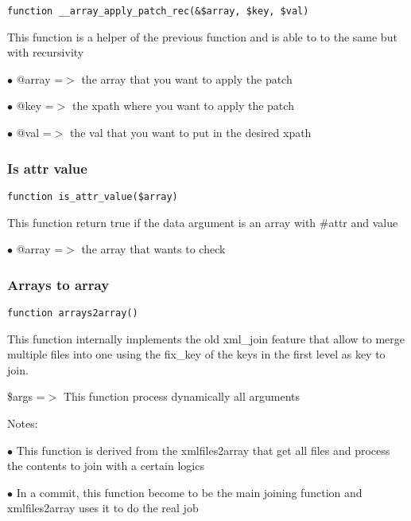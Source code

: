 \documentclass[a4paper]{article}
\begin{document}
\begin{lstlisting}
function __array_apply_patch_rec(&$array, $key, $val)
\end{lstlisting}

This function is a helper of the previous function and is able to to the
same but with recursivity

\begin{compactitem}
\item[\color{myblue}$\bullet$] @array =$>$ the array that you want to apply the patch
\item[\color{myblue}$\bullet$] @key   =$>$ the xpath where you want to apply the patch
\item[\color{myblue}$\bullet$] @val   =$>$ the val that you want to put in the desired xpath
\end{compactitem}

\hypertarget{toc62}{}
\subsubsection{Is attr value}

\begin{lstlisting}
function is_attr_value($array)
\end{lstlisting}

This function return true if the data argument is an array with \#attr and value

\begin{compactitem}
\item[\color{myblue}$\bullet$] @array =$>$ the array that wants to check
\end{compactitem}

\hypertarget{toc63}{}
\subsubsection{Arrays to array}

\begin{lstlisting}
function arrays2array()
\end{lstlisting}

This function internally implements the old xml\_join feature that allow to merge
multiple files into one using the fix\_key of the keys in the first level as key
to join.

\$args =$>$ This function process dynamically all arguments

Notes:

\begin{compactitem}
\item[\color{myblue}$\bullet$] This function is derived from the xmlfiles2array that get all files and process
  the contents to join with a certain logics
\item[\color{myblue}$\bullet$] In a commit, this function become to be the main joining function and xmlfiles2array
  uses it to do the real job
\end{compactitem}
\end{document}
